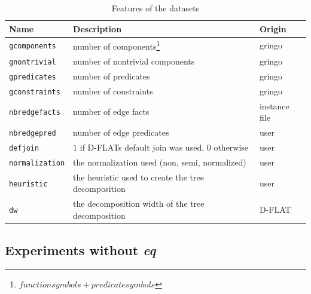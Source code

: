 \begin{table}
	\center
	\begin{tabular}{|l|l|l|}
		\hline
		Name & Description & Origin \\
		\hline
		\lstinline$gcomponents$ & number of components\footnote{$function symbols+ predicate symbols$} & gringo\\ %
		\lstinline$gnontrivial$ & number of nontrivial components & gringo\\
		\lstinline$gpredicates$ & number of predicates & gringo \\
		\lstinline$gconstraints$ & number of constraints & gringo\\
		\lstinline$nbredgefacts$ & number of edge facts & instance file\\
		\lstinline$nbredgepred$ & number of edge predicates & user \\
		\lstinline$defjoin$ & $1$ if D-FLATs default join was used, $0$ otherwise & user\\
		\lstinline$normalization$ & the normalization used (non, semi, normalized) & user\\
		\lstinline$heuristic$ & the heuristic used to create the tree decomposition & user\\
		\lstinline$dw$ & the decomposition width of the tree decomposition & D-FLAT\\
		\hline
	\end{tabular}
	\caption{Features of the datasets}
	\label{tbl:mlFeat}
\end{table}

\subsection{Experiments without \emph{eq}}
